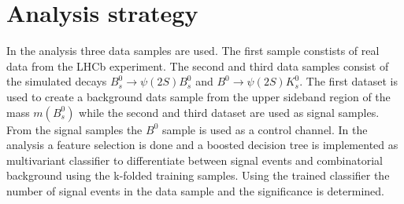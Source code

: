 \section{Analysis strategy}
\label{sec:Durchführung}
In the analysis three data samples are used. The first sample constists of real data from the LHCb experiment. The second and third data samples consist of 
the simulated decays $B_s^0 \rightarrow \psi(2S) B_s^0$ and $B^0 \rightarrow \psi(2S) K_s^0$. The first dataset is used to create a 
background dats sample from the upper sideband region of the mass $m(B_s^0)$ while the second and third dataset are used as signal samples.
From the signal samples the $B^0$ sample is used as a control channel. 
In the analysis a feature selection is done and a boosted decision tree is implemented as multivariant classifier  
to differentiate between signal events and combinatorial background using the k-folded training samples. 
Using the trained classifier the number of signal events in the data sample and the significance is determined.
